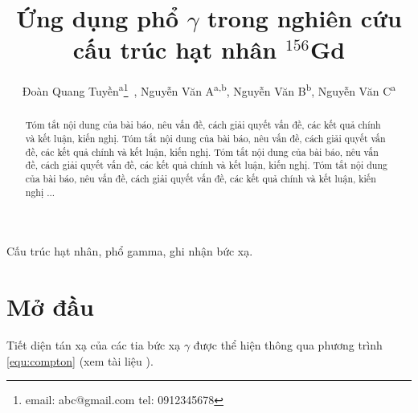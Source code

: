 \documentclass[11pt, a4paper, bold, center, twoside, journal]{paper}%
\begin{document}
\title{Ứng dụng phổ $\gamma$ trong nghiên cứu cấu trúc hạt nhân $^{156}$Gd}

\author{Đoàn Quang Tuyền\textsuperscript{a}\thanks{email: abc@gmail.com \newline tel: 0912345678}~, %
	Nguyễn Văn A\textsuperscript{a,b}, 
	Nguyễn Văn B\textsuperscript{b}, 
	Nguyễn Văn C\textsuperscript{a}
}




\maketitle

\begin{abstract}
Tóm tắt nội dung của bài báo, nêu vấn đề, cách giải quyết vấn đề, các kết quả chính và kết luận, kiến nghị. Tóm tắt nội dung của bài báo, nêu vấn đề, cách giải quyết vấn đề, các kết quả chính và kết luận, kiến nghị. Tóm tắt nội dung của bài báo, nêu vấn đề, cách giải quyết vấn đề, các kết quả chính và kết luận, kiến nghị. Tóm tắt nội dung của bài báo, nêu vấn đề, cách giải quyết vấn đề, các kết quả chính và kết luận, kiến nghị ...
\end{abstract}

\begin{keywords}
Cấu trúc hạt nhân, phổ gamma, ghi nhận bức xạ.
\end{keywords}

\section{Mở đầu}

Tiết diện tán xạ của các tia bức xạ $\gamma$ được thể hiện thông qua phương trình \ref{equ:compton} (xem tài liệu \cite{bib_Klein, bib_Knoll}).  
\end{document}
